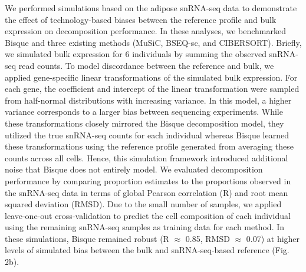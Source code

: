 We performed simulations based on the adipose snRNA-seq data to demonstrate the effect of technology-based biases between the reference profile and bulk expression on decomposition performance. In these analyses, we benchmarked Bisque and three existing methods (MuSiC, BSEQ-sc, and CIBERSORT). Briefly, we simulated bulk expression for 6 individuals by summing the observed snRNA-seq read counts. To model discordance between the reference and bulk, we applied gene-specific linear transformations of the simulated bulk expression. For each gene, the coefficient and intercept of the linear transformation were sampled from half-normal distributions with increasing variance. In this model, a higher variance corresponds to a larger bias between sequencing experiments. While these transformations closely mirrored the Bisque decomposition model, they utilized the true snRNA-seq counts for each individual whereas Bisque learned these transformations using the reference profile generated from averaging these counts across all cells. Hence, this simulation framework introduced additional noise that Bisque does not entirely model. We evaluated decomposition performance by comparing proportion estimates to the proportions observed in the snRNA-seq data in terms of global Pearson correlation (R) and root mean squared deviation (RMSD). Due to the small number of samples, we applied leave-one-out cross-validation to predict the cell composition of each individual using the remaining snRNA-seq samples as training data for each method. In these simulations, Bisque remained robust (R $\approx$ 0.85, RMSD $\approx$ 0.07) at higher levels of simulated bias between the bulk and snRNA-seq-based reference (Fig. 2b).
	 	 	
